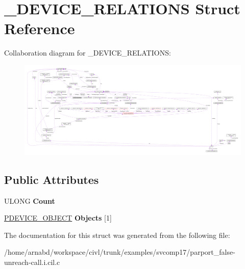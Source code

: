 \hypertarget{struct__DEVICE__RELATIONS}{}\section{\+\_\+\+D\+E\+V\+I\+C\+E\+\_\+\+R\+E\+L\+A\+T\+I\+O\+N\+S Struct Reference}
\label{struct__DEVICE__RELATIONS}


Collaboration diagram for \+\_\+\+D\+E\+V\+I\+C\+E\+\_\+\+R\+E\+L\+A\+T\+I\+O\+N\+S\+:
\nopagebreak
\begin{figure}[H]
\begin{center}
\leavevmode
\includegraphics[width=350pt]{struct__DEVICE__RELATIONS__coll__graph}
\end{center}
\end{figure}
\subsection*{Public Attributes}
\begin{DoxyCompactItemize}
\item 
\hypertarget{struct__DEVICE__RELATIONS_ae6f2c67301a27b85880a55760476ead9}{}U\+L\+O\+N\+G {\bfseries Count}\label{struct__DEVICE__RELATIONS_ae6f2c67301a27b85880a55760476ead9}

\item 
\hypertarget{struct__DEVICE__RELATIONS_afc3c9fe5d49b6b40b125b1dbf068f824}{}\hyperlink{struct__DEVICE__OBJECT}{P\+D\+E\+V\+I\+C\+E\+\_\+\+O\+B\+J\+E\+C\+T} {\bfseries Objects} \mbox{[}1\mbox{]}\label{struct__DEVICE__RELATIONS_afc3c9fe5d49b6b40b125b1dbf068f824}

\end{DoxyCompactItemize}


The documentation for this struct was generated from the following file\+:\begin{DoxyCompactItemize}
\item 
/home/arnabd/workspace/civl/trunk/examples/svcomp17/parport\+\_\+false-\/unreach-\/call.\+i.\+cil.\+c\end{DoxyCompactItemize}
